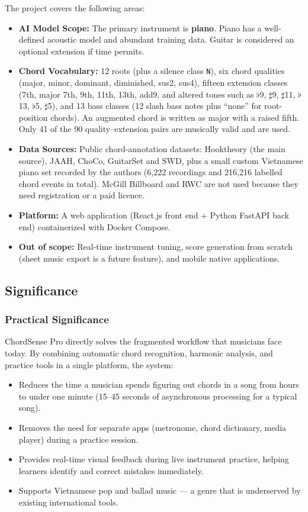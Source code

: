 \documentclass[a4paper]{article}
\begin{document}
The project covers the following areas:
\begin{itemize}
    \item \textbf{AI Model Scope:} The primary instrument is \textbf{piano}. Piano has a well-defined acoustic model and abundant training data. Guitar is considered an optional extension if time permits.
    \item \textbf{Chord Vocabulary:} 12 roots (plus a silence class \texttt{N}), six chord qualities (major, minor, dominant, diminished, sus2, sus4), fifteen extension classes (7th, major 7th, 9th, 11th, 13th, add9, and altered tones such as $\flat$9, $\sharp$9, $\sharp$11, $\flat$13, $\flat$5, $\sharp$5), and 13 bass classes (12 slash bass notes plus ``none'' for root-position chords). An augmented chord is written as major with a raised fifth. Only 41 of the 90 quality--extension pairs are musically valid and are used.
    \item \textbf{Data Sources:} Public chord-annotation datasets: Hooktheory (the main source), JAAH, ChoCo, GuitarSet and SWD, plus a small custom Vietnamese piano set recorded by the authors (6,222 recordings and 216,216 labelled chord events in total). McGill Billboard and RWC are not used because they need registration or a paid licence.
    \item \textbf{Platform:} A web application (React.js front end + Python FastAPI back end) containerized with Docker Compose.
    \item \textbf{Out of scope:} Real-time instrument tuning, score generation from scratch (sheet music export is a future feature), and mobile native applications.
\end{itemize}

\subsection{Significance}

\subsubsection{Practical Significance}

ChordSense Pro directly solves the fragmented workflow that musicians face today. By combining automatic chord recognition, harmonic analysis, and practice tools in a single platform, the system:
\begin{itemize}
    \item Reduces the time a musician spends figuring out chords in a song from hours to under one minute (15--45 seconds of asynchronous processing for a typical song).
    \item Removes the need for separate apps (metronome, chord dictionary, media player) during a practice session.
    \item Provides real-time visual feedback during live instrument practice, helping learners identify and correct mistakes immediately.
    \item Supports Vietnamese pop and ballad music --- a genre that is underserved by existing international tools.
\end{itemize}
\end{document}

